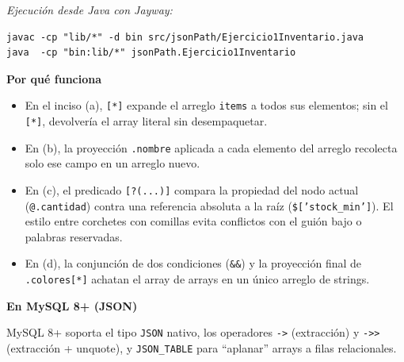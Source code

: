 \documentclass[11pt,a4paper]{article}
\newcommand{\itemcabecera}[1]{\noindent\textbf{#1}\par\medskip}
\newcommand{\bloquePorque}{\itemcabecera{Por qu\'e funciona}}
\newcommand{\bloqueMySQL}{\itemcabecera{En MySQL 8+ (JSON)}}
\begin{document}
\textit{Ejecución desde Java con Jayway:}

\begin{lstlisting}[style=plain]
javac -cp "lib/*" -d bin src/jsonPath/Ejercicio1Inventario.java
java  -cp "bin:lib/*" jsonPath.Ejercicio1Inventario
\end{lstlisting}

\bloquePorque

\begin{itemize}
    \item En el inciso (a), \texttt{[*]} expande el arreglo \texttt{items} a todos sus elementos; sin el \texttt{[*]}, devolvería el array literal sin desempaquetar.
    \item En (b), la proyección \texttt{.nombre} aplicada a cada elemento del arreglo recolecta solo ese campo en un arreglo nuevo.
    \item En (c), el predicado \texttt{[?(...)]} compara la propiedad del nodo actual (\texttt{@.cantidad}) contra una referencia absoluta a la raíz (\texttt{\$['stock\_min']}). El estilo entre corchetes con comillas evita conflictos con el guión bajo o palabras reservadas.
    \item En (d), la conjunción de dos condiciones (\texttt{\&\&}) y la proyección final de \texttt{.colores[*]} achatan el array de arrays en un único arreglo de strings.
\end{itemize}

\bloqueMySQL

MySQL 8+ soporta el tipo \texttt{JSON} nativo, los operadores \texttt{->} (extracción) y \texttt{->>} (extracción + unquote), y \texttt{JSON\_TABLE} para ``aplanar'' arrays a filas relacionales.
\end{document}
